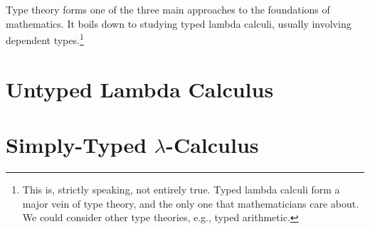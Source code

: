 \begin{node}\label{types-0000}%
Type theory forms one of the three main approaches to the foundations of
mathematics. It boils down to studying typed lambda calculi, usually
involving dependent types.\footnote{This is, strictly speaking, not
entirely true. Typed lambda calculi form a major vein of type theory,
and the only one that mathematicians care about. We could consider other
type theories, e.g., typed arithmetic.}
\end{node}

\section{Untyped Lambda Calculus}

\section{Simply-Typed $\lambda$-Calculus}
